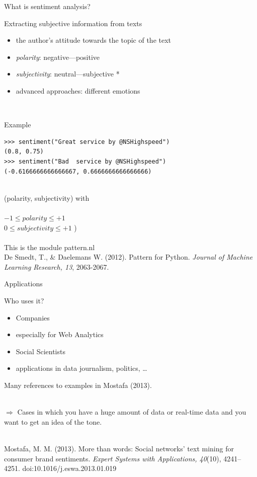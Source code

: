 \documentclass{beamer}
\begin{document}
\begin{frame}{What is sentiment analysis?}
\begin{block}{Extracting subjective information from texts}
\begin{itemize}
\item<2->  the author's attitude towards the topic of the text
\item<3-> \emph{polarity}: negative---positive
\item<4-> \emph{subjectivity}: neutral---subjective *
\item<5-> advanced approaches: different emotions
\end{itemize}
~\\ 
\footnotesize{
}
\end{block}
\end{frame}



\begin{frame}[fragile]{Example}
\begin{lstlisting}
>>> sentiment("Great service by @NSHighspeed")
(0.8, 0.75)
>>> sentiment("Bad  service by @NSHighspeed")
(-0.6166666666666667, 0.6666666666666666)
\end{lstlisting}
~\\
\footnotesize{(polarity, subjectivity) with \\ ~ \\
 $-1 \leq polarity \leq +1$\\
 $0 \leq subjectivity \leq +1$ )} \\~\\
\vskip 1cm 
\tiny{This is the module pattern.nl \\ De Smedt, T., \& Daelemans W. (2012).  Pattern for Python. \emph{Journal of Machine Learning Research, 13}, 2063-2067.\\}
\end{frame}


\begin{frame}{Applications}
\begin{block}{Who uses it?}
	\begin{itemize}
		\item Companies
		\item especially for Web Analytics
		\item Social Scientists
		\item applications in data journalism, politics, \ldots
	\end{itemize}
	Many references to examples in Mostafa (2013).
\end{block}
~\\
$\Rightarrow$ Cases in which you have a huge amount of data or real-time data and you want to get an idea of the tone. \\ ~
\par
\tiny{Mostafa, M. M. (2013). More than words: Social networks’ text mining for consumer brand sentiments. \emph{Expert Systems with Applications, 40}(10), 4241– 4251. doi:10.1016/j.eswa.2013.01.019}\\
\end{frame}
\end{document}

